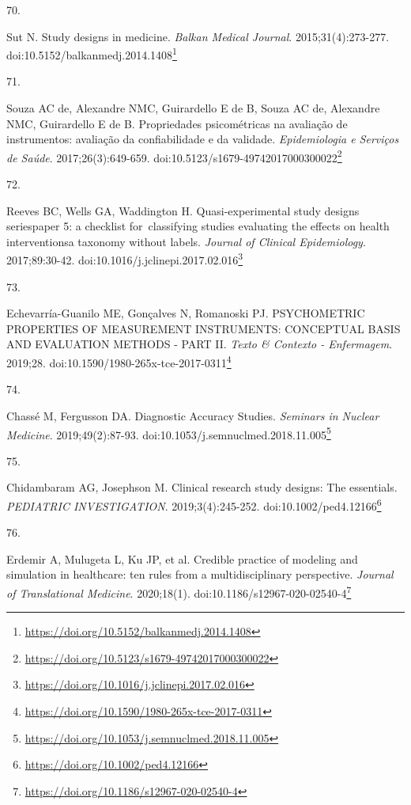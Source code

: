 \documentclass[
]{book}
\newlength{\cslhangindent}
\newlength{\csllabelwidth}
\newlength{\cslentryspacingunit} %
\newenvironment{CSLReferences}[2] %
 {%
  \setlength{\parindent}{0pt}
  \ifodd #1
  \let\oldpar\par
  \def\par{\hangindent=\cslhangindent\oldpar}
  \fi
  \setlength{\parskip}{#2\cslentryspacingunit}
 }%
 {}
\newcommand{\CSLLeftMargin}[1]{\parbox[t]{\csllabelwidth}{#1}}
\newcommand{\CSLRightInline}[1]{\parbox[t]{\linewidth - \csllabelwidth}{#1}\break}
\renewcommand{\href}[2]{#2\footnote{\url{#1}}}
\begin{document}
\begin{CSLReferences}{0}{0}
\leavevmode{}%
\CSLLeftMargin{70. }%
\CSLRightInline{Sut N. Study designs in medicine. \emph{Balkan Medical Journal}. 2015;31(4):273-277. doi:\href{https://doi.org/10.5152/balkanmedj.2014.1408}{10.5152/balkanmedj.2014.1408}}

\leavevmode{}%
\CSLLeftMargin{71. }%
\CSLRightInline{Souza AC de, Alexandre NMC, Guirardello E de B, Souza AC de, Alexandre NMC, Guirardello E de B. Propriedades psicométricas na avaliação de instrumentos: avaliação da confiabilidade e da validade. \emph{Epidemiologia e Serviços de Saúde}. 2017;26(3):649-659. doi:\href{https://doi.org/10.5123/s1679-49742017000300022}{10.5123/s1679-49742017000300022}}

\leavevmode{}%
\CSLLeftMargin{72. }%
\CSLRightInline{Reeves BC, Wells GA, Waddington H. Quasi-experimental study designs series{\textemdash}paper 5: a checklist for~classifying studies evaluating the effects on health interventions{\textemdash}a taxonomy without labels. \emph{Journal of Clinical Epidemiology}. 2017;89:30-42. doi:\href{https://doi.org/10.1016/j.jclinepi.2017.02.016}{10.1016/j.jclinepi.2017.02.016}}

\leavevmode{}%
\CSLLeftMargin{73. }%
\CSLRightInline{Echevarría-Guanilo ME, Gonçalves N, Romanoski PJ. PSYCHOMETRIC PROPERTIES OF MEASUREMENT INSTRUMENTS: CONCEPTUAL BASIS AND EVALUATION METHODS - PART II. \emph{Texto \& Contexto - Enfermagem}. 2019;28. doi:\href{https://doi.org/10.1590/1980-265x-tce-2017-0311}{10.1590/1980-265x-tce-2017-0311}}

\leavevmode{}%
\CSLLeftMargin{74. }%
\CSLRightInline{Chassé M, Fergusson DA. Diagnostic Accuracy Studies. \emph{Seminars in Nuclear Medicine}. 2019;49(2):87-93. doi:\href{https://doi.org/10.1053/j.semnuclmed.2018.11.005}{10.1053/j.semnuclmed.2018.11.005}}

\leavevmode{}%
\CSLLeftMargin{75. }%
\CSLRightInline{Chidambaram AG, Josephson M. Clinical research study designs: The essentials. \emph{PEDIATRIC INVESTIGATION}. 2019;3(4):245-252. doi:\href{https://doi.org/10.1002/ped4.12166}{10.1002/ped4.12166}}

\leavevmode{}%
\CSLLeftMargin{76. }%
\CSLRightInline{Erdemir A, Mulugeta L, Ku JP, et al. Credible practice of modeling and simulation in healthcare: ten rules from a multidisciplinary perspective. \emph{Journal of Translational Medicine}. 2020;18(1). doi:\href{https://doi.org/10.1186/s12967-020-02540-4}{10.1186/s12967-020-02540-4}}


\end{CSLReferences}
\end{document}
